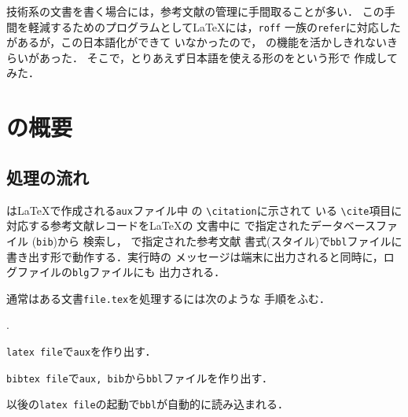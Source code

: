 技術系の文書を書く場合には，参考文献の管理に手間取ることが多い．
この手間を軽減するためのプログラムとして\LaTeX には，{\tt roff}
一族の{\tt refer}に対応した
\BibTeX があるが，この日本語化ができて
いなかったので，
\JLaTeX の機能を活かしきれないきらいがあった．
そこで，とりあえず日本語を使える形の\BibTeX を\JBibTeX という形で
作成してみた．

\section{\BibTeX の概要}

\subsection{処理の流れ}
\BibTeX は\LaTeX で作成される{\tt aux}ファイル中
の \verb|\citation|に示されて
いる \verb|\cite|項目に対応する参考文献レコードを\LaTeX の
文書中に \verb||で指定されたデータベースファイル
({\tt bib})から
検索し， \verb||で指定された参考文献
書式(スタイル)で{\tt bbl}ファイルに書き出す形で動作する．実行時の
メッセージは端末に出力されると同時に，ログファイルの{\tt blg}ファイルにも
出力される．

通常はある文書{\tt file.tex}を処理するには次のような
手順をふむ．

\begin{list}%
{.}{
\setlength{\parsep}{1pt}
\setlength{\itemsep}{1pt}
\setlength{\topsep}{1pt}
}
\item {\tt latex file}で{\tt aux}を作り出す．
\item {\tt bibtex file}で{\tt aux, bib}から{\tt bbl}ファイルを作り出す．
\item 以後の{\tt latex file}の起動で{\tt bbl}が自動的に読み込まれる．
\end{list}

